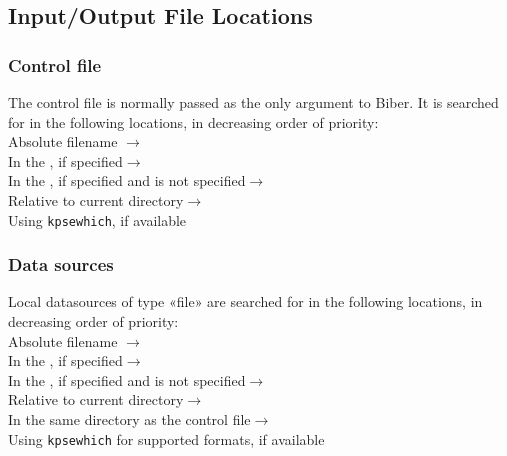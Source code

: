 \documentclass{ltxdockit}
\newcommand*{\biber}{Biber\xspace}
\begin{document}
\subsection{Input/Output File Locations}

\subsubsection{Control file}\label{loc:cf}

The control file is normally passed as the only argument to \biber. It is
searched for in the following locations, in decreasing order of
priority:\\[2ex]

\noindent Absolute filename $\rightarrow$\\
\hspace*{1em}In the , if specified$\rightarrow$\\
\hspace*{2em}In the , if specified and
 is not specified$\rightarrow$\\
\hspace*{3em}Relative to current directory$\rightarrow$\\
\hspace*{4em}Using \verb+kpsewhich+, if available

\subsubsection{Data sources}

Local datasources of type «file» are searched for in the following
locations, in decreasing order of priority:\\[2ex]

\noindent Absolute filename $\rightarrow$\\
\hspace*{1em}In the , if specified$\rightarrow$\\
\hspace*{2em}In the , if specified and
 is not specified$\rightarrow$\\
\hspace*{3em}Relative to current directory$\rightarrow$\\
\hspace*{4em}In the same directory as the control file$\rightarrow$\\
\hspace*{5em}Using \verb+kpsewhich+ for supported formats, if available\\[2ex]
\end{document}

